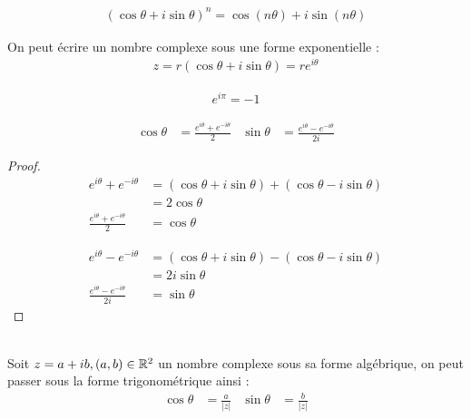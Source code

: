     \begin{proposition}
    \begin{align*}
        (\cos{\theta} + i \sin{\theta})^n = \cos{(n\theta)} + i\sin{(n\theta)} 
    \end{align*}
\end{proposition}


    \begin{definition}
    On peut écrire un nombre complexe sous une forme exponentielle :
    \begin{align*}
        z = r(\cos{\theta} + i\sin{\theta}) = re^{i\theta}
    \end{align*}
\end{definition}


    \begin{proposition}
    \begin{align*}
        e^{i \pi} = -1 
    \end{align*}
\end{proposition}

    \begin{proposition}
    \begin{align*}
        \cos{\theta} &= \frac{e^{i\theta} + e^{-i\theta}}{2} & \sin{\theta} &= \frac{e^{i\theta} - e^{-i\theta}}{2i}
    \end{align*}
\end{proposition}
\begin{proof}
        \begin{align*}
            e^{i\theta} + e^{-i\theta} &= (\cos{\theta} + i\sin{\theta}) + (\cos{\theta} - i\sin{\theta}) \\
                                       &= 2\cos{\theta} \\
        \frac{e^{i\theta} + e^{-i\theta}}{2} &= \cos{\theta}
        \end{align*}
        
        \begin{align*}
            e^{i\theta} - e^{-i\theta} &= (\cos{\theta} + i\sin{\theta}) - (\cos{\theta} - i\sin{\theta}) \\
                                       &= 2i\sin{\theta} \\
            \frac{e^{i\theta} - e^{-i\theta}}{2i} &= \sin{\theta} 
        \end{align*}
\end{proof}


\begin{remarque}~ 
    \\
    Soit $z = a + ib, (a, b) \in \mathbb{R}^2$ un nombre complexe sous sa forme algébrique, on peut passer sous la forme trigonométrique ainsi :
    \begin{align*}
        \cos{\theta} &= \frac{a}{|z|} & \sin{\theta} &= \frac{b}{|z|}
    \end{align*}
    \end{remarque}



